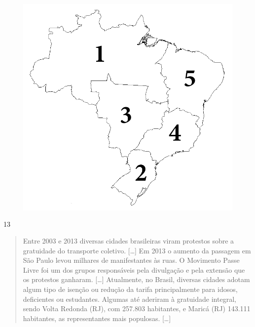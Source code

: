 \begin{figure}[htpb!]
\includegraphics[width=\textwidth]{../ilustracoes/CHU5/SAEB_5ANO_CHU_FIGURA1.png}
\end{figure}


\num{13}

\begin{quote}
Entre 2003 e 2013 diversas cidades brasileiras viram protestos sobre a
gratuidade do transporte coletivo. {[}\ldots{}{]} Em 2013 o aumento da passagem em São
Paulo levou milhares de manifestantes às ruas. O Movimento Passe Livre
foi um dos grupos responsáveis pela divulgação e pela extensão que os
protestos ganharam. {[}\ldots{}{]} Atualmente, no Brasil, diversas cidades adotam algum
tipo de isenção ou redução da tarifa principalmente para idosos,
deficientes ou estudantes. Algumas até aderiram à gratuidade integral,
sendo Volta Redonda (RJ), com 257.803 habitantes, e Maricá (RJ) 143.111
habitantes, as representantes mais populosas. {[}\ldots{}{]}

\end{quote}

